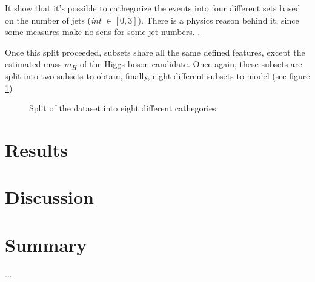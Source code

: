 \documentclass[10pt,conference,compsocconf]{IEEEtran}
\begin{document}
It show that it's possible to cathegorize the events into four different sets based on the number of jets (\emph{int} $\in [0, 3]$). There is a physics reason behind it, since some measures make no sens for some jet numbers. \cite{higgsChallenge}.

Once this split proceeded, subsets share all the same defined features, except the estimated mass $m_H$ of the Higgs boson candidate. Once again, these subsets are split into two subsets to obtain, finally, eight different subsets to model (see figure \ref{split})

\begin{figure}[tbph] %
  \centering
  \caption{Split of the dataset into eight different cathegories}
  \vspace{-3mm}
  \label{split}
\end{figure}




\section{Results}



\section{Discussion}


\section{Summary}

...




\end{document}
